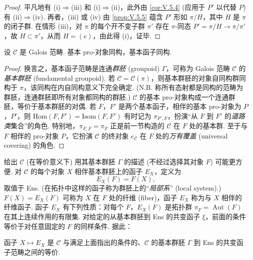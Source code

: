 \begin{proof}
平凡地有 (i)$\Rightarrow$(iii) 和 (i)$\Rightarrow$(ii)，此外由 \ref{cor:V.5.4} (应用于 $P'$ 以代替 $P$) 有 (ii)$\Rightarrow$(iv). 再者，(iii) 或 (iv) 由 \ref{prop:V.5.5} 蕴含 $P'$ 形如 $\pi/H$，其中 $H$ 是 $\pi$ 的闭子群. 在情形 (iii)，对 $\pi$ 的每个开不变子群 $\pi'$ 存在 $\pi$-同态 $P' = \pi/H \to \pi/\pi'$，故 $H \subset \pi'$，从而 $H = (e)$，由此得 (i)，证毕.
\end{proof}

\begin{corollary}\label{cor:V.5.7}
设 $\mathcal{C}$ 是 Galois 范畴. 基本 pro-对象同构，基本函子同构.
\end{corollary}

\begin{proof}
换言之，基本函子范畴是连通\emph{群胚} (groupoid) $\Gamma$，可称为 Galois 范畴 $\mathcal{C}$ 的\emph{基本群胚} (fundamental groupoid). 若 $\mathcal{C} = \mathcal{C}(\pi)$，则基本群胚的对象自同构群同构于 $\pi$，该同构在内自同构意义下完全确定. (N.B. 称所有态射都是同构的范畴为群胚，连通群胚即所有对象都同构的群胚.) $\mathcal{C}$ 的基本 pro-对象构成一个连通群胚，等价于基本群胚的对偶. 若 $F$，$F'$ 是两个基本函子，相伴的基本 pro-对象为 $P$，$P'$，则 $\mathrm{Hom}(F, F') = \mathrm{Isom}(F, F')$ 有时记为 $\pi_{F', F}$，扮演``从 $F$ 到 $F'$ 的\emph{道路类}集合''的角色. 特别地，$\pi_{F, F} = \pi_F$ 正是前一节构造的 $\mathcal{C}$ 在 $F$ 处的基本群. 至于与 $F$ 相伴的 pro-对象 $P$，它扮演 $\mathcal{C}$ 的终对象 $e_{\mathcal{C}}$ 在 $F$ 处的\emph{万有覆盖} (universal covering) 的角色.
\end{proof}

给出 $\mathcal{C}$ (在等价意义下) 用其基本群胚 $\Gamma$ 的描述 (不经过选择其对象 $F$) 可能更方便. 对 $\mathcal{C}$ 的每个对象 $X$ 相伴基本群胚上的函子 $E_X$，定义为
\[
E_X(F) = F(X),
\]
取值于 Ens. (在拓扑中这样的函子称为群胚上的``\emph{局部系}'' (local system).) $F(X) = E_X(F)$ 可称为 $X$ 在 $F$ 处的纤维 (fiber)，函子 $E_X$ 称为与 $X$ 相伴的纤维函子. 函子 $E_X$ 有下列性质：对每个 $F$，$E_X(F)$ 是拓扑群 $\pi_F = \operatorname{Aut}(F)$ 在其上连续作用的有限集. 对给定的从基本群胚到 Ens 的共变函子 $\xi$，前面的条件等价于对任意固定的 $F$ 的同样条件. 据此：

\begin{proposition}\label{prop:V.5.8}
函子 $X \mapsto E_X$ 是 $\mathcal{C}$ 与满足上面指出的条件的、$\mathcal{C}$ 的基本群胚 $\Gamma$ 到 Ens 的共变函子范畴之间的等价.
\end{proposition}


